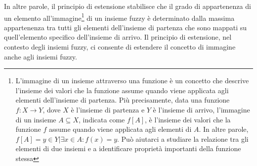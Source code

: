 In altre parole, il principio di estensione stabilisce che il grado di appartenenza di un elemento all'immagine\footnote{L'immagine di un insieme attraverso una funzione è un concetto che descrive l'insieme dei valori che la funzione assume quando viene applicata agli elementi dell'insieme di partenza. Più precisamente, data una funzione $f: X \rightarrow Y$, dove $X$ è l'insieme di partenza e $Y$ è l'insieme di arrivo, l'immagine di un insieme $A \subseteq X$, indicata come $f[A]$, è l'insieme dei valori che la funzione $f$ assume quando viene applicata agli elementi di $A$. In altre parole, $f[A] = {y \in Y | \exists x \in A : f(x) = y}$. Può aiutarci a studiare la relazione tra gli elementi di due insiemi e a identificare proprietà importanti della funzione stessa} di un insieme fuzzy è determinato dalla massima appartenenza tra tutti gli elementi dell'insieme di partenza che sono mappati su quell'elemento specifico dell'insieme di arrivo. Il principio di estensione, nel contesto degli insiemi fuzzy, ci consente di estendere il concetto di immagine anche agli insiemi fuzzy.

